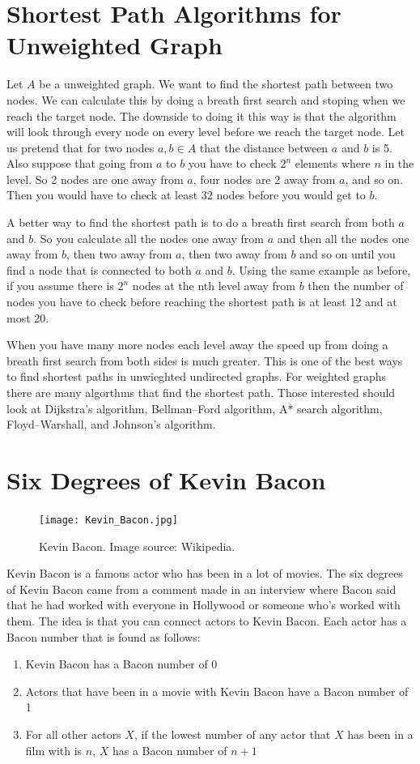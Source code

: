 \section*{Shortest Path Algorithms for Unweighted Graph}
Let $A$ be a unweighted graph. We want to find the shortest path between two nodes. We can calculate this by doing a breath first search and stoping when we reach the target node. The downside to doing it this way is that the algorithm will look through every node on every level before we reach the target node. Let us pretend that for two nodes $a, b \in A$ that the distance between $a$ and $b$ is 5. Also suppose that going from $a$ to $b$ you have to check $2^n$ elements where $n$ in the level. So 2 nodes are one away from $a$, four nodes are 2 away from $a$, and so on. Then you would have to check at least 32 nodes before you would get to $b$.

A better way to find the shortest path is to do a breath first search from both $a$ and $b$. So you calculate all the nodes one away from $a$ and then all the nodes one away from $b$, then two away from $a$, then two away from $b$ and so on until you find a node that is connected to both $a$ and $b$. Using the same example as before, if you assume there is $2^n$ nodes at the nth level away from $b$ then the number of nodes you have to check before reaching the shortest path is at least 12 and at most 20.

When you have many more nodes each level away the speed up from doing a breath first search from both sides is much greater. This is one of the best ways to find shortest paths in unwieghted undirected graphs. For weighted graphs there are many algorthms that find the shortest path. Those interested should look at Dijkstra's algorithm, Bellman–Ford algorithm, A* search algorithm, Floyd–Warshall, and Johnson's algorithm.


\section*{Six Degrees of Kevin Bacon}
\begin{figure}[h]
\texttt{[image: Kevin\_Bacon.jpg]}
\caption{Kevin Bacon.  Image source: Wikipedia.}
\end{figure}

Kevin Bacon is a famous actor who has been in a lot of movies. The six degrees of Kevin Bacon came from a comment made in an interview where Bacon said that he had worked with everyone in Hollywood or someone who's worked with them.  The idea is that you can connect actors to Kevin Bacon. Each actor has a Bacon number that is found as follows:
\begin{enumerate}
\item Kevin Bacon has a Bacon number of 0
\item Actors that have been in a movie with Kevin Bacon have a Bacon number of 1
\item For all other actors $X$, if the lowest number of any actor that $X$ has been in a film with is $n$, $X$ has a Bacon number of $n+1$
\end{enumerate}

